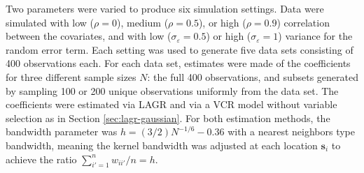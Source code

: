 \documentclass[authoryear,review, 12pt]{elsarticle}
\begin{document}
Two parameters were varied to produce six simulation settings.
Data were simulated with low ($\rho=0$), medium ($\rho=0.5$), or high ($\rho=0.9$)
correlation between the covariates, and with
low ($\sigma_{\varepsilon}=0.5$) or high ($\sigma_{\varepsilon}=1$)
variance for the random error term. Each setting was used to generate five data sets consisting of 400 observations each.
For each data set, estimates were made of the coefficients for three different sample sizes $N$: the full 400 observations, and subsets generated by sampling 100 or 200 unique observations uniformly from the data set.
The coefficients were estimated via LAGR and via a VCR model without variable selection as in Section \ref{sec:lagr-gaussian}.
For both estimation methods, the bandwidth parameter was $h=(3/2)N^{-1/6} - 0.36$ with a nearest neighbors type bandwidth, meaning the kernel bandwidth was adjusted at each location $\bm{s}_i$ to achieve the ratio $\sum_{i'=1}^n w_{ii'}/n = h$.
\end{document}
